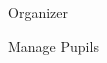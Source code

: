
\begin{section}{Organizer}

    \begin{subsection}{Manage Pupils}
    
    
    
    \end{subsection}

\end{section}

